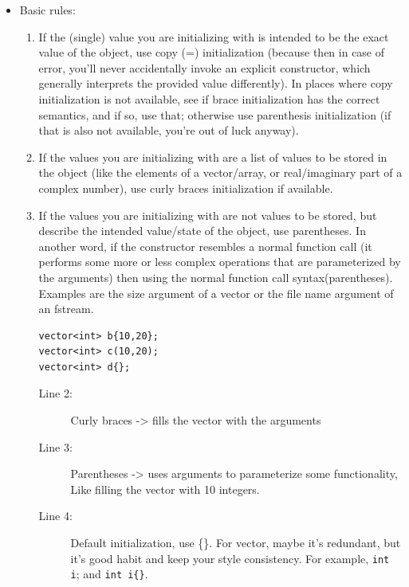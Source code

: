 \documentclass[a4paper,11pt,twoside]{book}
\begin{document}
\begin{itemize}
	
		\item Basic rules:
	\begin{enumerate}
		\item If the (single) value you are initializing with is intended to be the exact value of the object, use copy (=) initialization (because then in case of error, you'll never accidentally invoke an explicit constructor, which generally interprets the provided value differently). In places where copy initialization is not available, see if brace initialization has the correct semantics, and if so, use that; otherwise use parenthesis initialization (if that is also not available, you're out of luck anyway).
		
		\item If the values you are initializing with are a list of values to be stored in the object (like the elements of a vector/array, or real/imaginary part of a complex number), use curly braces initialization if available. 
		
		\item If the values you are initializing with are not values to be stored, but describe the intended value/state of the object, use parentheses. In another word, if the constructor resembles a normal function call (it performs some more or less complex operations that are parameterized by the arguments) then using the normal function call syntax(parentheses). Examples are the size argument of a vector or the file name argument of an fstream. 
		
\begin{lstlisting}
vector<int> b{10,20};
vector<int> c(10,20);
vector<int> d{};
\end{lstlisting}
		\begin{description}
			\item[Line 2:] Curly braces -> fills the vector with the arguments
			\item[Line 3:] Parentheses -> uses arguments to parameterize some functionality, Like filling the vector with 10 integers.
			\item[Line 4:] Default initialization, use \{\}. For vector, maybe it's redundant, but it's good habit and keep your style consistency. For example, \texttt{int i}; and \texttt{int i\{\}}.
		\end{description}
	\end{enumerate}


\end{itemize}
\end{document}
